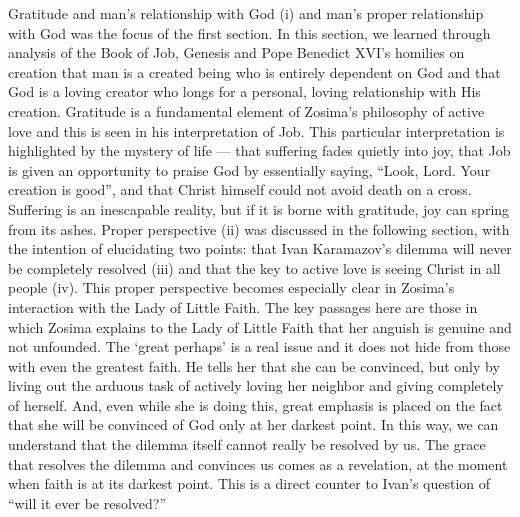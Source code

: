 Gratitude and man’s relationship with God (i) and man’s proper relationship with God was the focus of the first section. In this section, we learned through analysis of the Book of Job, Genesis and Pope Benedict XVI’s homilies on creation that man is a created being who is entirely dependent on God and that God is a loving creator who longs for a personal, loving relationship with His creation. Gratitude is a fundamental element of Zosima’s philosophy of active love and this is seen in his interpretation of Job. This particular interpretation is highlighted by the mystery of life — that suffering fades quietly into joy, that Job is given an opportunity to praise God by essentially saying, “Look, Lord. Your creation is good”, and that Christ himself could not avoid death on a cross. Suffering is an inescapable reality, but if it is borne with gratitude, joy can spring from its ashes.
 Proper perspective (ii) was discussed in the following section, with the intention of elucidating two points: that Ivan Karamazov’s dilemma will never be completely resolved (iii) and that the key to active love is seeing Christ in all people (iv). This proper perspective becomes especially clear in Zosima’s interaction with the Lady of Little Faith. The key passages here are those in which Zosima explains to the Lady of Little Faith that her anguish is genuine and not unfounded. The ‘great perhaps’ is a real issue and it does not hide from those with even the greatest faith. He tells her that she can be convinced, but only by living out the arduous task of actively loving her neighbor and giving completely of herself. And, even while she is doing this, great emphasis is placed on the fact that she will be convinced of God only at her darkest point. In this way, we can understand that the dilemma itself cannot really be resolved by us. The grace that resolves the dilemma and convinces us comes as a revelation, at the moment when faith is at its darkest point.  This is a direct counter to Ivan’s question of “will it ever be resolved?” 
